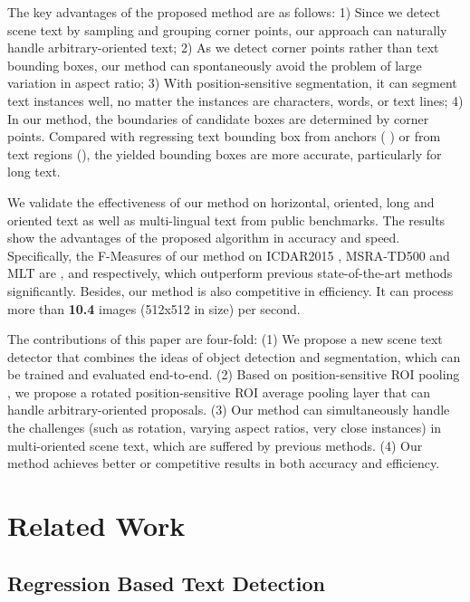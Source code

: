 \documentclass[10pt,twocolumn,letterpaper]{article}
\begin{document}
The key advantages of the proposed method are as follows: 1) Since we detect scene text by sampling and grouping corner points, our approach can naturally handle arbitrary-oriented text; 2) As we detect corner points rather than text bounding boxes, our method can spontaneously avoid the problem of large variation in aspect ratio; 3) With position-sensitive segmentation, it can segment text instances well, no matter the instances are characters, words, or text lines; 4) In our method, the boundaries of candidate boxes are determined by corner points. Compared with regressing text bounding box from anchors ( \cite{liao2017textboxes, ma2017arbitrary}) or from text regions (\cite{Zhou_2017_CVPR,He_2017_ICCV}), the yielded bounding boxes are more accurate, particularly for long text.

We validate the effectiveness of our method on horizontal, oriented, long and oriented text as well as multi-lingual text from public benchmarks. The results show the advantages of the proposed algorithm in accuracy and speed. Specifically, the F-Measures of our method on ICDAR2015 \cite{karatzas2015icdar}, MSRA-TD500 \cite{yao2012detecting} and MLT \cite{MLT-Challenge} are \textbf{}, \textbf{} and \textbf{} respectively, which outperform previous state-of-the-art methods significantly. Besides, our method is also competitive in efficiency. It can process more than \textbf{10.4} images (512x512 in size) per second. 

The contributions of this paper are four-fold: (1) We propose a new scene text detector that combines the ideas of object detection and segmentation, which can be trained and evaluated end-to-end. (2) Based on position-sensitive ROI pooling \cite{dai2016r}, we propose a rotated position-sensitive ROI average pooling layer that can handle arbitrary-oriented proposals. (3) Our method can simultaneously handle the challenges (such as rotation, varying aspect ratios, very close instances) in multi-oriented scene text, which are suffered by previous methods. (4) Our method achieves better or competitive results in both accuracy and efficiency.

\section{Related Work}

\subsection{Regression Based Text Detection}
\end{document}
